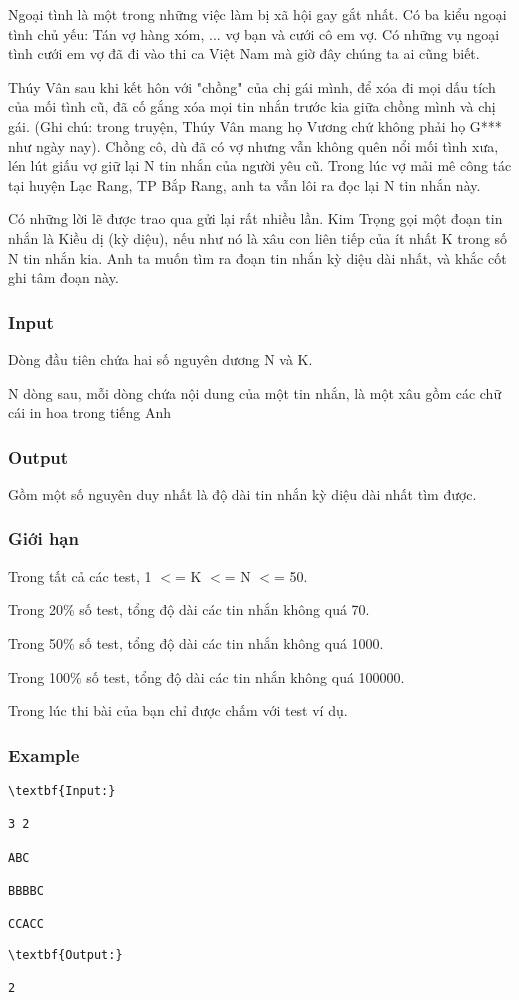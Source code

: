 

Ngoại tình là một trong những việc làm bị xã hội gay gắt nhất. Có ba kiểu ngoại tình chủ yếu: Tán vợ hàng xóm, ... vợ bạn và cưới cô em vợ. Có những vụ ngoại tình cưới em vợ đã đi vào thi ca Việt Nam mà giờ đây chúng ta ai cũng biết.

Thúy Vân sau khi kết hôn với "chồng" của chị gái mình, để xóa đi mọi dấu tích của mối tình cũ, đã cố gắng xóa mọi tin nhắn trước kia giữa chồng mình và chị gái. (Ghi chú: trong truyện, Thúy Vân mang họ Vương chứ không phải họ G*** như ngày nay). Chồng cô, dù đã có vợ nhưng vẫn không quên nổi mối tình xưa, lén lút giấu vợ giữ lại N tin nhắn của người yêu cũ. Trong lúc vợ mải mê công tác tại huyện Lạc Rang, TP Bắp Rang, anh ta vẫn lôi ra đọc lại N tin nhắn này.

Có những lời lẽ được trao qua gửi lại rất nhiều lần. Kim Trọng gọi một đoạn tin nhắn là Kiều dị (kỳ diệu), nếu như nó là xâu con liên tiếp của ít nhất K trong số N tin nhắn kia. Anh ta muốn tìm ra đoạn tin nhắn kỳ diệu dài nhất, và khắc cốt ghi tâm đoạn này.

\subsubsection{Input}

Dòng đầu tiên chứa hai số nguyên dương N và K.

N dòng sau, mỗi dòng chứa nội dung của một tin nhắn, là một xâu gồm các chữ cái in hoa trong tiếng Anh

\subsubsection{Output}

Gồm một số nguyên duy nhất là độ dài tin nhắn kỳ diệu dài nhất tìm được.

\subsubsection{Giới hạn}

Trong tất cả các test, 1 $<$= K $<$= N $<$= 50.

Trong 20\% số test, tổng độ dài các tin nhắn không quá 70.

Trong 50\% số test, tổng độ dài các tin nhắn không quá 1000.

Trong 100\% số test, tổng độ dài các tin nhắn không quá 100000.

Trong lúc thi bài của bạn chỉ được chấm với test ví dụ.

\subsubsection{Example}
\begin{verbatim}
\textbf{Input:}

3 2

ABC

BBBBC

CCACC\end{verbatim}
\begin{verbatim}
\textbf{Output:}

2\end{verbatim}